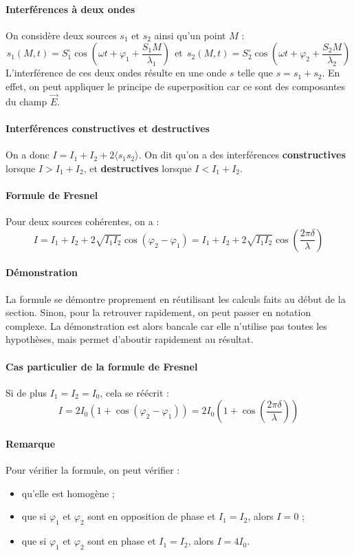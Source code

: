 \documentclass[french]{book}
\theoremstyle{plain}
\theoremstyle{definition}
\theoremstyle{remark}
\begin{document}
\paragraph{Interférences à deux ondes} On considère deux sources $s_1$ et $s_2$ ainsi qu'un point $M$ : $$s_1(M,t)=S_1^\circ\cos\left(\omega t+\varphi_1+\frac{S_1M}{\lambda_1}\right) \ \ \text{et} \ \ s_2(M,t)=S_2^\circ\cos\left(\omega t+\varphi_2+\frac{S_2M}{\lambda_2}\right)$$
L'interférence de ces deux ondes résulte en une onde $s$ telle que $s=s_1+s_2$. En effet, on peut appliquer le principe de superposition car ce sont des composantes du champ $\overrightarrow{E}$.
\paragraph{Interférences constructives et destructives} On a donc $I=I_1+I_2+2\langle s_1s_2\rangle$. On dit qu'on a des interférences \textbf{constructives} lorsque $I>I_1+I_2$, et \textbf{destructives} lorsque $I<I_1+I_2$.
\paragraph{Formule de Fresnel} Pour deux sources cohérentes, on a : $$I=I_1+I_2+2\sqrt{I_1I_2}\cos\left(\varphi_2-\varphi_1\right)=I_1+I_2+2\sqrt{I_1I_2}\cos\left(\frac{2\pi\delta}{\lambda}\right)$$
\paragraph{Démonstration} La formule se démontre proprement en réutilisant les calculs faits au début de la section. Sinon, pour la retrouver rapidement, on peut passer en notation complexe. La démonstration est alors bancale car elle n'utilise pas toutes les hypothèses, mais permet d'aboutir rapidement au résultat.
\paragraph{Cas particulier de la formule de Fresnel} Si de plus $I_1=I_2=I_0$, cela se réécrit : $$I=2I_0(1+\cos(\varphi_2-\varphi_1))=2I_0\left(1+\cos\left(\frac{2\pi\delta}{\lambda}\right)\right)$$
\paragraph{Remarque} Pour vérifier la formule, on peut vérifier :
\begin{itemize}
	\item qu'elle est homogène ;
	\item que si $\varphi_1$ et $\varphi_2$ sont en opposition de phase et $I_1=I_2$, alors $I=0$ ;
	\item que si $\varphi_1$ et $\varphi_2$ sont en phase et $I_1=I_2$, alors $I=4I_0$.
\end{itemize}
\end{document}

